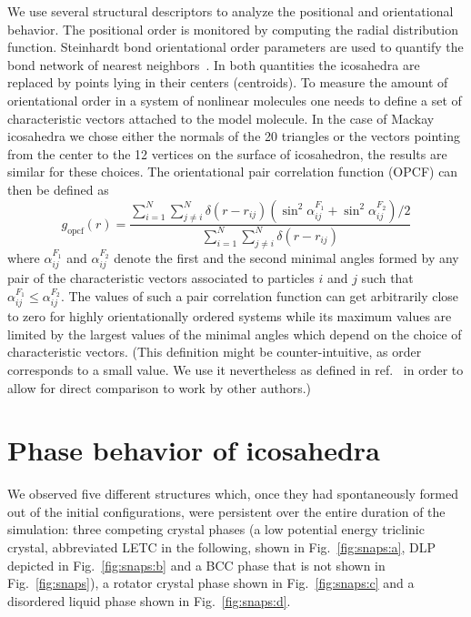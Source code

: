 \documentclass[10pt,aps,pre,twocolumn,superscriptaddress,amsmath,amssymb]{revtex4-1}
\begin{document}
We use several structural descriptors to analyze the positional and orientational behavior.
The positional order is monitored by computing the radial distribution function.
Steinhardt bond orientational order parameters are used to quantify the bond network of nearest neighbors~\cite{Steinhardt1983, Wang2005}.
In both quantities the icosahedra are replaced by points lying in their centers (centroids).
To measure the amount of orientational order in a system of nonlinear molecules one needs to define a set of characteristic vectors attached to the model molecule. In the case of Mackay icosahedra we chose either the normals of the 20 triangles or the vectors pointing from the center to the 12 vertices on the surface of icosahedron, the results are similar for these choices.
The orientational pair correlation function (OPCF) can then be defined as~\cite{Chen2014}
\begin{equation}
 g_\text{opcf}(r)=\frac{\sum\limits_{i=1}^{N}\sum\limits_{j\ne i}^{N}\delta(r-r_{ij}) \left(\sin^2\alpha_{ij}^{F_1}+\sin^2\alpha_{ij}^{F_2}\right)/2}{\sum\limits_{i=1}^{N}\sum\limits_{j\ne i}^{N}\delta(r-r_{ij})}
\end{equation}
where $\alpha_{ij}^{F_1}$ and $\alpha_{ij}^{F_2}$ denote the first and the second minimal angles formed by any pair of the characteristic vectors associated to particles $i$ and $j$ such that $\alpha_{ij}^{F_1}\le\alpha_{ij}^{F_2}$.
The values of such a pair correlation function can get arbitrarily close to zero for highly orientationally ordered systems while its maximum values are limited by the largest values of the minimal angles which depend on the choice of characteristic vectors. (This definition might be counter-intuitive, as order corresponds to a small value. We use it nevertheless as defined in ref.~\cite{Chen2014} in order to allow for direct comparison to work by other authors.)

\section{Phase behavior of icosahedra}

We observed five different structures which, once they had spontaneously formed out of the initial configurations, were persistent over the entire duration of the simulation: three competing crystal phases (a low potential energy triclinic crystal, abbreviated LETC in the following, shown in Fig.~\ref{fig:snaps:a}, DLP depicted in Fig.~\ref{fig:snaps:b} and a BCC phase that is not shown in Fig.~\ref{fig:snaps}), a rotator crystal phase shown in Fig.~\ref{fig:snaps:c} and a disordered liquid phase shown in Fig.~\ref{fig:snaps:d}.
\end{document}
